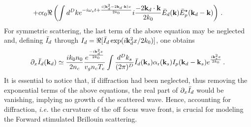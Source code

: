 \documentclass[
 reprint,
 amsmath,amssymb,
 aps,
]{revtex4-1}
\begin{document}
\begin{widetext}
\begin{align}
  \nonumber\\
 +c\epsilon_0  \Re\left( \int d^Dk e^{-i\omega_s t+\frac{ i( \mathbf{k}_d^2-2\mathbf{k}_d\cdot \mathbf{k} )x}{2k_0}} 
i\frac{ -2\mathbf{k}_d\cdot \mathbf{k}}{2k_0} \Bar{E}_d(\mathbf{k})\Bar{E}_p^\star(\mathbf{k}_d-\mathbf{k} )
  \right)
\, . \label{eq:g2}
\end{align}
For symmetric scattering, the last term  of the above equation may be neglected and, defining $\Bar{I}_d$ through $I_d = \Re[\Bar{I}_d\exp(i\mathbf{k}_d^2x/2k_0)]$, one obtains
 \begin{align}
\partial_x\Bar{I}_d(\mathbf{k}_d)\simeq  \frac{ik_0n_0}{2n_c} \frac{e^{\frac{-i\mathbf{k}_d^2x}{2k_0}} }{  v_g n_c T_e}   
  \int \frac{d^Dk_s}{(2\pi)^D} \Bar{I}_d(\mathbf{k}_s) \alpha_\mathrm{r}(\mathbf{k}_s) 
I_p(\mathbf{k}_d-\mathbf{k}_s)
e^{\frac{i\mathbf{k}_s^2x}{2k_0}} 
\, . \label{eq:g3}
\end{align}
It is essential to notice that, if diffraction had been neglected, thus removing the exponential terms of the above equations, the real part of $\partial_x \Bar{I}_d$ would be vanishing, implying no growth of the scattered wave. Hence, accounting for diffraction, \emph{i.e.} the curvature of the off focus wave front,  is crucial for modeling the Forward stimulated Brillouin scattering.


\end{widetext}
\end{document}
